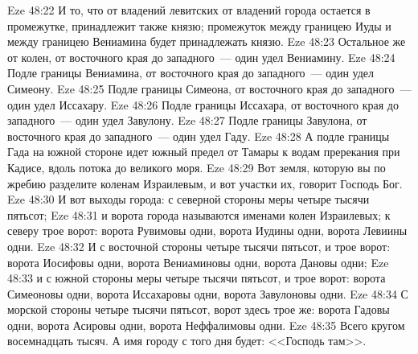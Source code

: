 \vs Eze 48:22 И то, что от владений левитских  от владений города остается в промежутке, принадлежит также князю; промежуток между границею Иуды и между границею Вениамина будет принадлежать князю.
\vs Eze 48:23 Остальное же от колен, от восточного края до западного~--- один удел Вениамину.
\vs Eze 48:24 Подле границы Вениамина, от восточного края до западного~--- один удел Симеону.
\vs Eze 48:25 Подле границы Симеона, от восточного края до западного~--- один удел Иссахару.
\vs Eze 48:26 Подле границы Иссахара, от восточного края до западного~--- один удел Завулону.
\vs Eze 48:27 Подле границы Завулона, от восточного края до западного~--- один удел Гаду.
\vs Eze 48:28 А подле границы Гада на южной стороне идет южный предел от Тамары к водам пререкания при Кадисе, вдоль потока до великого моря.
\vs Eze 48:29 Вот земля, которую вы по жребию разделите коленам Израилевым, и вот участки их, говорит Господь Бог.
\vs Eze 48:30 И вот выходы города: с северной стороны меры четыре тысячи пятьсот;
\vs Eze 48:31 и ворота города называются именами колен Израилевых; к северу трое ворот: ворота Рувимовы одни, ворота Иудины одни, ворота Левиины одни.
\vs Eze 48:32 И с восточной стороны  четыре тысячи пятьсот, и трое ворот: ворота Иосифовы одни, ворота Вениаминовы одни, ворота Дановы одни;
\vs Eze 48:33 и с южной стороны меры четыре тысячи пятьсот, и трое ворот: ворота Симеоновы одни, ворота Иссахаровы одни, ворота Завулоновы одни.
\vs Eze 48:34 С морской стороны  четыре тысячи пятьсот, ворот здесь трое же: ворота Гадовы одни, ворота Асировы одни, ворота Неффалимовы одни.
\vs Eze 48:35 Всего кругом восемнадцать тысяч. А имя городу с того дня будет: <<Господь там>>.
